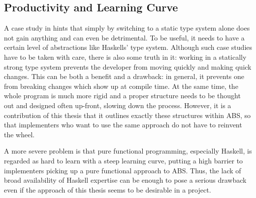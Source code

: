 



\subsection{Productivity and Learning Curve}
A case study in \cite{hanenberg_experiment_2010} hints that simply by switching to a static type system alone does not gain anything and can even be detrimental. To be useful, it needs to have a certain level of abstractions like Haskells' type system. Although such case studies have to be taken with care, there is also some truth in it: working in a statically strong type system prevents the developer from moving quickly and making quick changes. This can be both a benefit and a drawback: in general, it prevents one from breaking changes which show up at compile time. At the same time, the whole program is much more rigid and a proper structure needs to be thought out and designed often up-front, slowing down the process. However, it is a contribution of this thesis that it outlines exactly these structures within ABS, so that implementers who want to use the same approach do not have to reinvent the wheel.

A more severe problem is that pure functional programming, especially Haskell, is regarded as hard to learn with a steep learning curve, putting a high barrier to implementers picking up a pure functional approach to ABS. Thus, the lack of broad availability of Haskell expertise can be enough to pose a serious drawback even if the approach of this thesis seems to be desirable in a project.